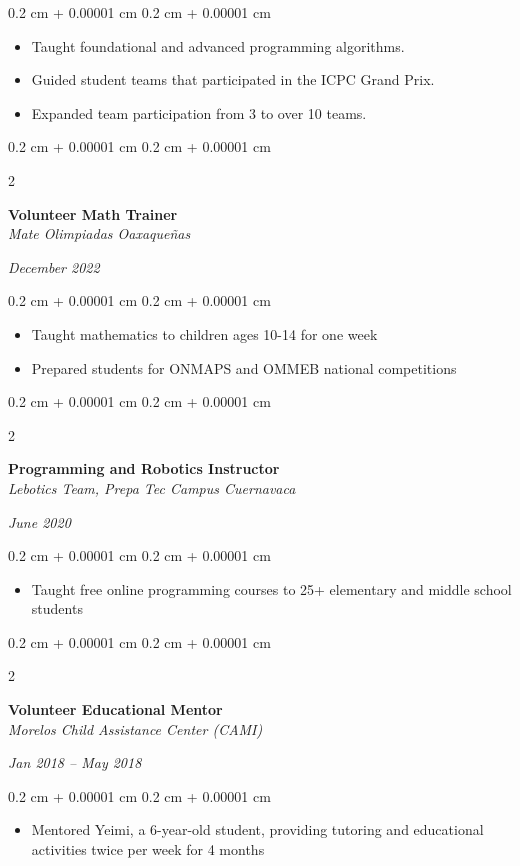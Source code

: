 \documentclass[10pt, letterpaper]{article}
\newenvironment{onecolentry}{
    \begin{adjustwidth}{
        0.2 cm + 0.00001 cm
    }{
        0.2 cm + 0.00001 cm
    }
}{
    \end{adjustwidth}
} %
\newenvironment{twocolentry}[2][]{
    \onecolentry
    \def\secondColumn{#2}
    \setcolumnwidth{\fill, 4.5 cm}
    \begin{paracol}{2}
}{
    \switchcolumn \raggedleft \secondColumn
    \end{paracol}
    \endonecolentry
} %
\begin{document}
        \begin{onecolentry}
            \begin{itemize}
                \item Taught foundational and advanced programming algorithms.
                \item Guided student teams that participated in the ICPC Grand Prix.
                \item Expanded team participation from 3 to over 10 teams.
            \end{itemize}
        \end{onecolentry}
        \vspace{0.2 cm}
        \begin{twocolentry}{
        \textit{December 2022}}
            \textbf{Volunteer Math Trainer } \\
            \textit{Mate Olimpiadas Oaxaqueñas}
        \end{twocolentry}
        \begin{onecolentry}
            \begin{itemize}
                \item Taught mathematics to children ages 10-14 for one week
                \item Prepared students for ONMAPS and OMMEB national competitions
            \end{itemize}
        \end{onecolentry}
        \vspace{0.2 cm}
        \begin{twocolentry}{
        \textit{June 2020}}
            \textbf{Programming and Robotics Instructor} \\
            \textit{Lebotics Team, Prepa Tec Campus Cuernavaca}
        \end{twocolentry}
        \begin{onecolentry}
            \begin{itemize}
                \item Taught free online programming courses to 25+ elementary and middle school students
            \end{itemize}
        \end{onecolentry}
        \vspace{0.2 cm}
        \begin{twocolentry}{
        \textit{Jan 2018 – May 2018}}
            \textbf{Volunteer Educational Mentor} \\
            \textit{Morelos Child Assistance Center (CAMI)}
        \end{twocolentry}
        \begin{onecolentry}
            \begin{itemize}
                \item Mentored Yeimi, a 6-year-old student, providing tutoring and educational activities twice per week for 4 months
            \end{itemize}
        \end{onecolentry}
\end{document}
